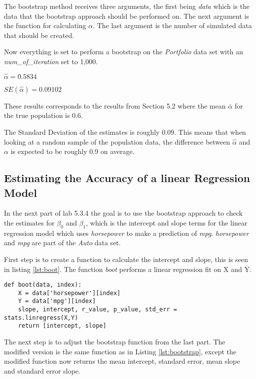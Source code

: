 The bootstrap method receives three arguments, the first being \emph{data} which is the data that the bootstrap approach should be performed on. The next argument is the function for calculating $\alpha$. The last argument is the number of simulated data that should be created.  

Now everything is set to perform a bootstrap on the \emph{Portfolio} data set with an \emph{num\_of\_iteration} set to 1,000.

\begin{center}
	$\hat{\alpha} = 0.5834$
\end{center}

\begin{center}
	$SE(\hat{\alpha}) = 0.09102$
\end{center}

These results corresponds to the results from Section 5.2\citep{ISLR} where the mean $\bar{\alpha}$ for the true population is 0.6. 

The Standard Deviation of the estimates is roughly 0.09. This means that when looking at a random sample of the population data, the difference between $\hat{\alpha}$ and $\alpha$ is expected to be roughly 0.9 on average.


\subsection{Estimating the Accuracy of a linear Regression Model}

In the next part of lab 5.3.4 the goal is to use the bootstrap approach to check the estimates for $\beta_0$ and $\beta_1$, which is the intercept and slope terms for the linear regression model which uses \emph{horsepower} to make a prediction of \emph{mpg}. \emph{horsepower} and \emph{mpg} are part of the \emph{Auto} data set.

First step is to create a function to calculate the intercept and slope, this is seen in listing \ref{lst:boot}. The function \emph{boot} performs a linear regression fit on X and Y. 

\begin{lstlisting}[caption={Boot function in python}, label=lst:boot, mathescape=true]
def boot(data, index):
	X = data['horsepower'][index]
	Y = data['mpg'][index]
	slope, intercept, r_value, p_value, std_err = stats.linregress(X,Y)
	return [intercept, slope]
\end{lstlisting}

The next step is to adjust the bootstrap function from the last part. The modified version is the same function as in Listing \ref{lst:bootstrap}, except the modified function now returns the mean intercept, standard error, mean slope and standard error slope.

